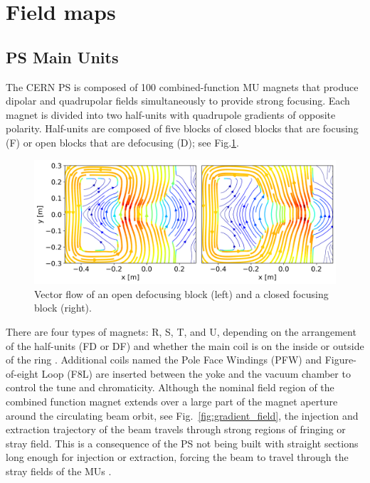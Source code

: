 \documentclass[a4paper,
               biblatex,     %
               keeplastbox,   %
               ]{jacow}
\begin{document}
\section{Field maps}
\subsection{PS Main Units}
The CERN PS is composed of 100 combined-function MU magnets that produce dipolar and quadrupolar fields simultaneously to provide strong focusing. Each magnet is divided into two half-units with quadrupole gradients of opposite polarity. Half-units are composed of five blocks of closed blocks that are focusing (F) or open blocks that are defocusing (D); see Fig.\ref{fig:streamplot}.

\begin{figure}[!htb]
   \centering
   \includegraphics*[width=1.0\columnwidth]{MOPOTK030_f1.png}
   \caption{Vector flow of an open defocusing block (left) and a closed focusing block (right).}
   \label{fig:streamplot}
\end{figure}

There are four types of magnets: R, S, T, and U, depending on the arrangement of the half-units (FD or DF) and whether the main coil is on the inside or outside of the ring \cite{steerenberg_fifty_2011}. Additional coils named the Pole Face Windings (PFW) and Figure-of-eight Loop (F8L) are inserted between the yoke and the vacuum chamber to control the tune and chromaticity. Although the nominal field region of the combined function magnet extends over a large part of the magnet aperture around the circulating beam orbit, see Fig.~\ref{fig:gradient_field}, the injection and extraction trajectory of the beam travels through strong regions of fringing or stray field. This is a consequence of the PS not being built with straight sections long enough for injection or extraction, forcing the beam to travel through the stray fields of the MUs \cite{risselada_beam_nodate}.
\end{document}
